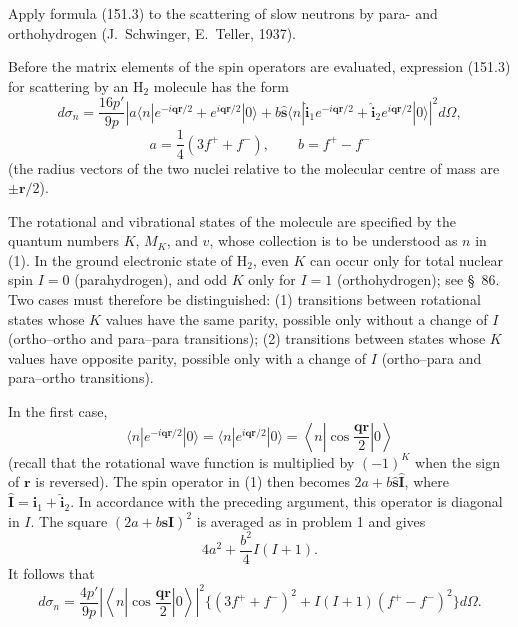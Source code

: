 Apply formula (151.3) to the scattering of slow neutrons by para- and orthohydrogen (J.~Schwinger, E.~Teller, 1937).

\SolutionHeading Before the matrix elements of the spin operators are evaluated, expression (151.3) for scattering by an $\mathrm H_2$ molecule has the form
\begin{equation}
 d\sigma_n=\frac{16p'}{9p}\left|a\langle n|e^{-i\mathbf q\mathbf r/2}+e^{i\mathbf q\mathbf r/2}|0\rangle
 +b\hat{\mathbf s}\langle n|\hat{\mathbf i}_1e^{-i\mathbf q\mathbf r/2}+\hat{\mathbf i}_2e^{i\mathbf q\mathbf r/2}|0\rangle\right|^2d\Omega,
 \tag{1}
\end{equation}
\[
 a=\frac14(3f^++f^-),\qquad b=f^+-f^-
\]
(the radius vectors of the two nuclei relative to the molecular centre of mass are $\pm\mathbf r/2$).

The rotational and vibrational states of the molecule are specified by the quantum numbers $K$, $M_K$, and $v$, whose collection is to be understood as $n$ in (1). In the ground electronic state of $\mathrm H_2$, even $K$ can occur only for total nuclear spin $I=0$ (parahydrogen), and odd $K$ only for $I=1$ (orthohydrogen); see \S~86. Two cases must therefore be distinguished: (1) transitions between rotational states whose $K$ values have the same parity, possible only without a change of $I$ (ortho--ortho and para--para transitions); (2) transitions between states whose $K$ values have opposite parity, possible only with a change of $I$ (ortho--para and para--ortho transitions).

In the first case,
\[
 \langle n|e^{-i\mathbf q\mathbf r/2}|0\rangle
 =\langle n|e^{i\mathbf q\mathbf r/2}|0\rangle
 =\left\langle n\left|\cos\frac{\mathbf q\mathbf r}{2}\right|0\right\rangle
\]
(recall that the rotational wave function is multiplied by $(-1)^K$ when the sign of $\mathbf r$ is reversed). The spin operator in (1) then becomes $2a+b\hat{\mathbf s}\hat{\mathbf I}$, where $\hat{\mathbf I}=\hat{\mathbf i}_1+\hat{\mathbf i}_2$. In accordance with the preceding argument, this operator is diagonal in $I$. The square $(2a+b\mathbf s\mathbf I)^2$ is averaged as in problem 1 and gives
\[
 4a^2+\frac{b^2}{4}I(I+1).
\]
It follows that
\begin{equation}
 d\sigma_n=\frac{4p'}{9p}\left|\left\langle n\left|\cos\frac{\mathbf q\mathbf r}{2}\right|0\right\rangle\right|^2
 \big\{(3f^++f^-)^2+I(I+1)(f^+-f^-)^2\big\}d\Omega.
 \tag{2}
\end{equation}

